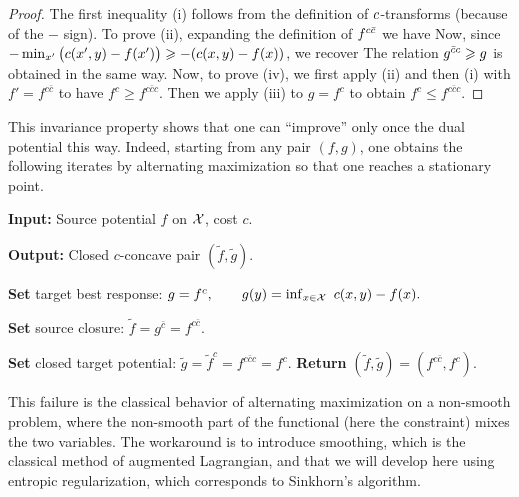 \begin{proof} The first inequality (i) follows from the definition of $c$-transforms (because of the $-$ sign). To prove (ii), expanding the definition of $f^{c\bar{c}}$ we have
Now, since $-\min_{x'}\big(c(x',y)-f(x')\big) \geqslant -(c(x,y)-f(x))$, we recover
The relation $g^{\bar{c}c} \geqslant g$ is obtained in the same way.
%
Now, to prove (iv), we first apply (ii) and then (i) with $f'=f^{c\bar c}$ to have $f^c \geq f^{c \bar c c}$.
Then we apply (iii) to $g=f^c$ to obtain $f^c \leq f^{c\bar c c}$.
\end{proof}

This invariance property shows that one can ``improve'' only once the dual potential this way. Indeed, starting from any pair $(f,g)$, one obtains the following iterates by alternating maximization
so that one reaches a stationary point.

\begin{alg}\label{alg:hard-c-transform-closure}
\textbf{Input:} Source potential $f$ on $\mathcal{X}$, cost $c$.

\textbf{Output:} Closed $c$-concave pair $(\tilde f,\tilde g)$.

\textbf{Set} target best response:
\(g=f^c, \qquad g(y)=\inf_{x\in\X}\ c(x,y)-f(x).\)

\textbf{Set} source closure:
\(\tilde f=g^{\bar c}=f^{c\bar c}.\)

\textbf{Set} closed target potential:
\(\tilde g=\tilde f^c=f^{c\bar c c}=f^c.\)
\textbf{Return} $(\tilde f,\tilde g)=(f^{c\bar c},f^c)$.
\end{alg}

%
This failure is the classical behavior of alternating maximization on a non-smooth problem, where the non-smooth part of the functional (here the constraint) mixes the two variables.
%
The workaround is to introduce smoothing, which is the classical method of augmented Lagrangian, and that we will develop here using entropic regularization, which corresponds to Sinkhorn's algorithm.

